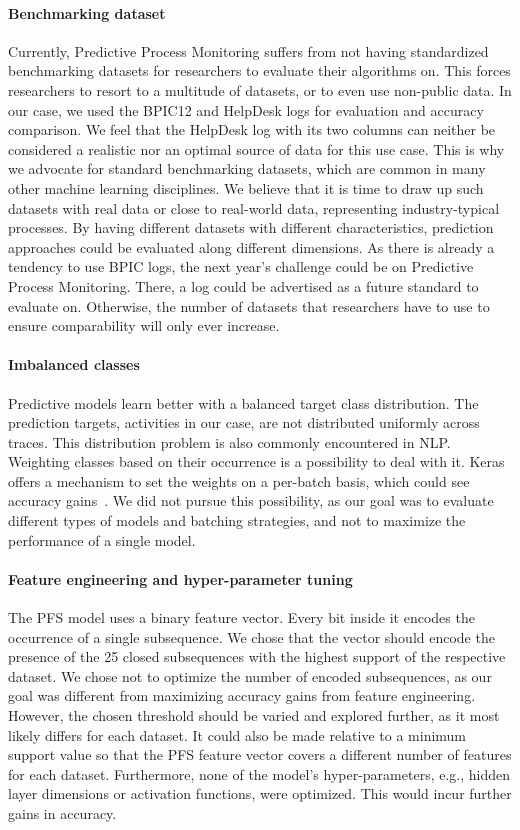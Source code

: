 \paragraph{Benchmarking dataset} Currently, Predictive Process Monitoring suffers from not having standardized benchmarking datasets for researchers to evaluate their algorithms on.
This forces researchers to resort to a multitude of datasets, or to even use non-public data.
In our case, we used the BPIC12 and HelpDesk logs for evaluation and accuracy comparison.
We feel that the HelpDesk log with its two columns can neither be considered a realistic nor an optimal source of data for this use case.
This is why we advocate for standard benchmarking datasets, which are common in many other machine learning disciplines.
We believe that it is time to draw up such datasets with real data or close to real-world data, representing industry-typical processes.
By having different datasets with different characteristics, prediction approaches could be evaluated along different dimensions.
As there is already a tendency to use BPIC logs, the next year's challenge could be on Predictive Process Monitoring.
There, a log could be advertised as a future standard to evaluate on.
Otherwise, the number of datasets that researchers have to use to ensure comparability will only ever increase.

\paragraph{Imbalanced classes} Predictive models learn better with a balanced target class distribution.
The prediction targets, activities in our case, are not distributed uniformly across traces.
This distribution problem is also commonly encountered in NLP.
Weighting classes based on their occurrence is a possibility to deal with it.
Keras offers a mechanism to set the weights on a per-batch basis, which could see accuracy gains~\cite{web:stackoverflow-keras-class-weights}.
We did not pursue this possibility, as our goal was to evaluate different types of models and batching strategies, and not to maximize the performance of a single model.

\paragraph{Feature engineering and hyper-parameter tuning} The PFS model uses a binary feature vector.
Every bit inside it encodes the occurrence of a single subsequence.
We chose that the vector should encode the presence of the 25 closed subsequences with the highest support of the respective dataset.
We chose not to optimize the number of encoded subsequences, as our goal was different from maximizing accuracy gains from feature engineering.
However, the chosen threshold should be varied and explored further, as it most likely differs for each dataset.
It could also be made relative to a minimum support value so that the PFS feature vector covers a different number of features for each dataset.
Furthermore, none of the model's hyper-parameters, e.g., hidden layer dimensions or activation functions, were optimized.
This would incur further gains in accuracy.

